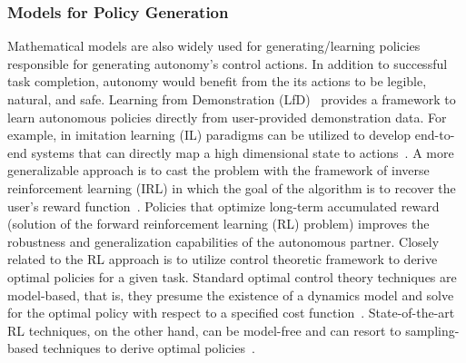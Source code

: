 \documentclass[12pt]{article}
\begin{document}
\subsubsection{Models for Policy Generation}

Mathematical models are also widely used for generating/learning policies responsible for generating autonomy's control actions. In addition to successful task completion, autonomy would benefit from the its actions to be legible, natural, and safe. Learning from Demonstration (LfD)~\cite{argall2009survey} provides a framework to learn autonomous policies directly from user-provided demonstration data. For example, in imitation learning (IL) paradigms can be utilized to develop end-to-end systems that can directly map a high dimensional state to actions~\cite{bojarski2016end}. A more generalizable approach is to cast the problem with the framework of inverse reinforcement learning (IRL) in which the goal of the algorithm is to recover the user's reward function~\cite{ziebart2008maximum}.  Policies that optimize long-term accumulated reward (solution of the forward reinforcement learning (RL) problem) improves the robustness and generalization capabilities of the autonomous partner. Closely related to the RL approach is to utilize control theoretic framework to derive optimal policies for a given task. Standard optimal control theory techniques are model-based, that is, they presume the existence of a dynamics model and solve for the optimal policy with respect to a specified cost function~\cite{kirk1970optimal}. State-of-the-art RL techniques, on the other hand, can be model-free and can resort to sampling-based techniques to derive optimal policies~\cite{watkins1992q}. 
\end{document}
